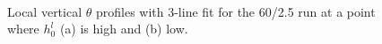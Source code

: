 \begin{figure}[htbp]
\begin{minipage}[b]{0.5\linewidth}
        \\
        \end{minipage}             
\quad
\begin{minipage}[b]{0.5\linewidth}
       
       \end{minipage}
\caption[High local ML ]{Local vertical $\theta$ profiles with 3-line fit for the 60/2.5 run at a point where $h^{l}_{0}$ (a) is high and (b) low.}
\label{fig:rssfitshigh}
\end{figure}

